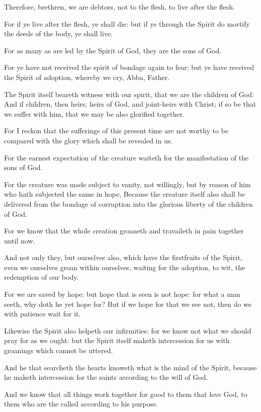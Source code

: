 \verse Therefore, brethren, we are debtors, not to the flesh, to live after the flesh.

\verse For if ye live after the flesh, ye shall die: but if ye through the Spirit do mortify the deeds of the body, ye shall live.

\verse For as many as are led by the Spirit of God, they are the sons of God.

\verse For ye have not received the spirit of bondage again to fear; but ye have received the Spirit of adoption, whereby we cry, Abba, Father.

\verse The Spirit itself beareth witness with our spirit, that we are the children of God: \verse And if children, then heirs; heirs of God, and joint-heirs with Christ; if so be that we suffer with him, that we may be also glorified together.

\verse For I reckon that the sufferings of this present time are not worthy to be compared with the glory which shall be revealed in us.

\verse For the earnest expectation of the creature waiteth for the manifestation of the sons of God.

\verse For the creature was made subject to vanity, not willingly, but by reason of him who hath subjected the same in hope, \verse Because the creature itself also shall be delivered from the bondage of corruption into the glorious liberty of the children of God.

\verse For we know that the whole creation groaneth and travaileth in pain together until now.

\verse And not only they, but ourselves also, which have the firstfruits of the Spirit, even we ourselves groan within ourselves, waiting for the adoption, to wit, the redemption of our body.

\verse For we are saved by hope: but hope that is seen is not hope: for what a man seeth, why doth he yet hope for?  \verse But if we hope for that we see not, then do we with patience wait for it.

\verse Likewise the Spirit also helpeth our infirmities: for we know not what we should pray for as we ought: but the Spirit itself maketh intercession for us with groanings which cannot be uttered.

\verse And he that searcheth the hearts knoweth what is the mind of the Spirit, because he maketh intercession for the saints according to the will of God.

\verse And we know that all things work together for good to them that love God, to them who are the called according to his purpose.

